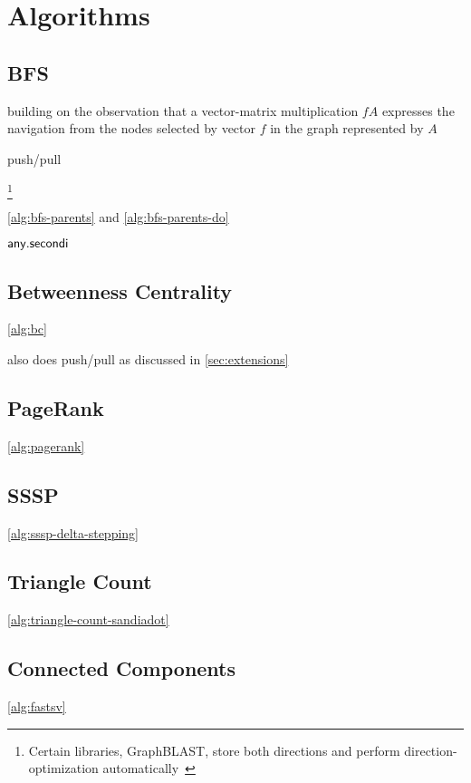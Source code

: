 \section{Algorithms}
\label{sec:algorithms}

\subsection{BFS}
\label{sec:bfs}

building on the observation that a vector-matrix multiplication $fA$ expresses the navigation from the nodes selected by vector $f$ in the graph represented by $A$

push/pull~\cite{DBLP:conf/icpp/YangBO18}

\footnote{Certain \grb libraries, \eg GraphBLAST, store both directions and perform direction-optimization automatically~\cite{DBLP:journals/corr/abs-1908-01407}}



\autoref{alg:bfs-parents} and \autoref{alg:bfs-parents-do}

$\mathbin{\mathsf{any.secondi}}$

\subsection{Betweenness Centrality}
\label{sec:bc}



\autoref{alg:bc}

also does push/pull as discussed in \autoref{sec:extensions}

\subsection{PageRank}
\label{sec:pagerank}




\autoref{alg:pagerank}

\subsection{SSSP}
\label{sec:sssp}



\autoref{alg:sssp-delta-stepping}

\subsection{Triangle Count}
\label{sec:triangle-count}



\autoref{alg:triangle-count-sandiadot}

\subsection{Connected Components}
\label{sec:connected-components}



\autoref{alg:fastsv}
